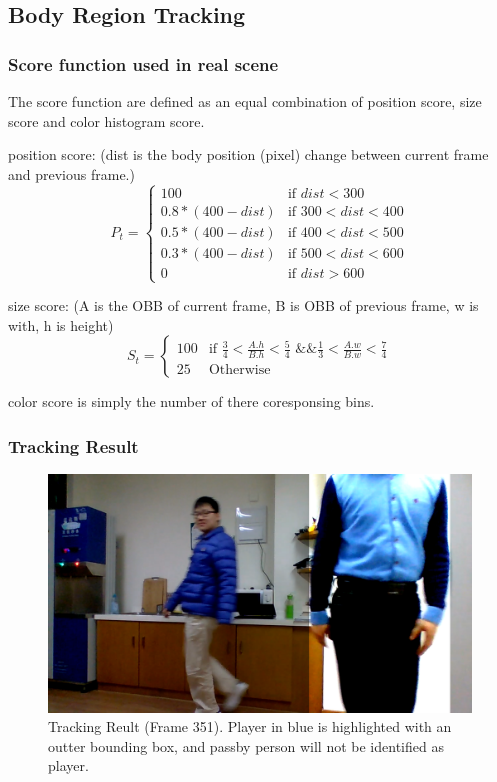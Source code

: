 \documentclass[11pt,twocolumn,letterpaper]{article}
\begin{document}
  \subsection{Body Region Tracking}
\subsubsection{Score function used in real scene}
The score function are defined as an equal combination of position score, size score and color histogram score.
\par
position score: (dist is the body position (pixel) change between current frame and previous frame.)
\begin{equation}
    P_{t}=
   \begin{cases}
   100 &\mbox{if $dist < 300$}\\
   0.8*(400-dist) &\mbox{if $300 < dist < 400$}\\
0.5*(400-dist) &\mbox{if $400 < dist < 500$}\\
0.3*(400-dist) &\mbox{if $500 < dist < 600$}\\
0 &\mbox{if $dist > 600$}
   \end{cases}
  \end{equation}

size score: (A is the OBB of current frame, B is OBB of previous frame, w is with, h is height)
\begin{equation}
    S_{t}=
   \begin{cases}
   100 &\mbox{if $\frac{3}{4} < \frac{A.h}{B.h} < \frac{5}{4} $ \&\& $\frac{1}{3} < \frac{A.w}{B.w} < \frac{7}{4} $}\\
25 &\mbox{Otherwise}
   \end{cases}
  \end{equation}

\par
color score is simply the number of there coresponsing bins.

\subsubsection{Tracking Result}
\begin{figure}[h]
      \centering
      \includegraphics[width=0.8\linewidth]{./Pic/tracking-351.png}
      \caption{Tracking Reult (Frame 351). Player in blue is highlighted with an outter bounding box, and passby person will not be identified as player.}
	\label{tracking}      
\end{figure}
\end{document}
